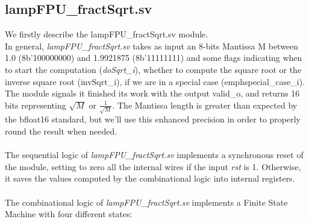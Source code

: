 \subsection{lampFPU\_fractSqrt.sv}
We firstly describe the lampFPU\_fractSqrt.sv module. \\
In general, \emph{lampFPU\_fractSqrt.sv} takes as input an 8-bits Mantissa M between 1.0 (8b'100000000) and 1.9921875 (8b'11111111) and some flags indicating when to start the computation (\emph{doSqrt\_i}), whether to compute the square root or the inverse square root ({invSqrt\_i}), if we are in a special case (emph{special\_case\_i}).\\
The module signals it finished its work with the output valid\_o, and returns 16 bits representing $\sqrt{M}$ or $\frac{1}{\sqrt{M}}$. The Mantissa length is greater than expected by the bfloat16 standard, but we'll use this enhanced precision in order to properly round the result when needed.\\\\
The sequential logic of \emph{lampFPU\_fractSqrt.sv} implements a synchronous reset of the module, setting to zero all the internal wires if the input \emph{rst} is 1. Otherwise, it saves the values computed by the combinational logic into internal registers.\\\\
The combinational logic of \emph{lampFPU\_fractSqrt.sv} implements a Finite State Machine with four different states:
